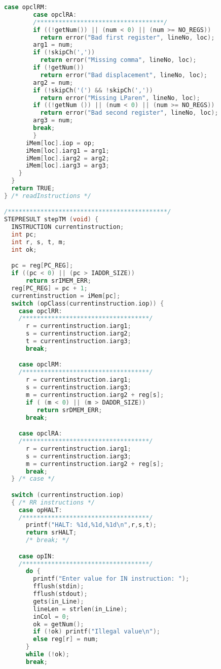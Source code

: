 \documentclass[lang=cn,10pt]{elegantbook}
\begin{document}
\begin{lstlisting}[caption={tm.c},language=c]
        case opclRM:
        case opclRA:
        /***********************************/
        if ((!getNum()) || (num < 0) || (num >= NO_REGS))
          return error("Bad first register", lineNo, loc);
        arg1 = num;
        if (!skipCh(','))
          return error("Missing comma", lineNo, loc);
        if (!getNum())
          return error("Bad displacement", lineNo, loc);
        arg2 = num;
        if (!skipCh('(') && !skipCh(','))
          return error("Missing LParen", lineNo, loc);
        if ((!getNum ()) || (num < 0) || (num >= NO_REGS))
          return error("Bad second register", lineNo, loc);
        arg3 = num;
        break;
        }
      iMem[loc].iop = op;
      iMem[loc].iarg1 = arg1;
      iMem[loc].iarg2 = arg2;
      iMem[loc].iarg3 = arg3;
    }
  }
  return TRUE;
} /* readInstructions */

/********************************************/
STEPRESULT stepTM (void) {
  INSTRUCTION currentinstruction;
  int pc;
  int r, s, t, m;
  int ok;

  pc = reg[PC_REG];
  if ((pc < 0) || (pc > IADDR_SIZE))
      return srIMEM_ERR;
  reg[PC_REG] = pc + 1;
  currentinstruction = iMem[pc];
  switch (opClass(currentinstruction.iop)) {
    case opclRR:
    /***********************************/
      r = currentinstruction.iarg1;
      s = currentinstruction.iarg2;
      t = currentinstruction.iarg3;
      break;

    case opclRM:
    /***********************************/
      r = currentinstruction.iarg1;
      s = currentinstruction.iarg3;
      m = currentinstruction.iarg2 + reg[s];
      if ( (m < 0) || (m > DADDR_SIZE))
         return srDMEM_ERR;
      break;

    case opclRA:
    /***********************************/
      r = currentinstruction.iarg1;
      s = currentinstruction.iarg3;
      m = currentinstruction.iarg2 + reg[s];
      break;
  } /* case */

  switch (currentinstruction.iop)
  { /* RR instructions */
    case opHALT:
    /***********************************/
      printf("HALT: %1d,%1d,%1d\n",r,s,t);
      return srHALT;
      /* break; */

    case opIN:
    /***********************************/
      do {
        printf("Enter value for IN instruction: ");
        fflush(stdin);
        fflush(stdout);
        gets(in_Line);
        lineLen = strlen(in_Line);
        inCol = 0;
        ok = getNum();
        if (!ok) printf("Illegal value\n");
        else reg[r] = num;
      }
      while (!ok);
      break;


\end{lstlisting}
\end{document}
